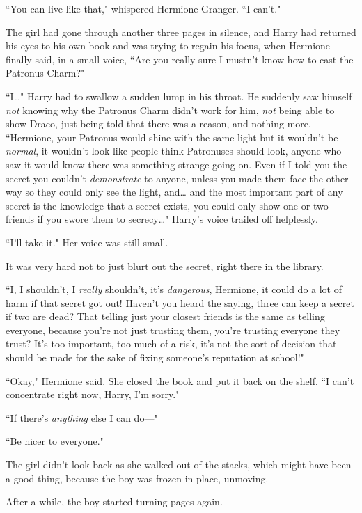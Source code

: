``You can live like that," whispered Hermione Granger. ``I can't."

The girl had gone through another three pages in silence, and Harry had returned his eyes to his own book and was trying to regain his focus, when Hermione finally said, in a small voice, ``Are you really sure I mustn't know how to cast the Patronus Charm?"

``I{\ldots}" Harry had to swallow a sudden lump in his throat. He suddenly saw himself \emph{not} knowing why the Patronus Charm didn't work for him, \emph{not} being able to show Draco, just being told that there was a reason, and nothing more. ``Hermione, your Patronus would shine with the same light but it wouldn't be \emph{normal}, it wouldn't look like people think Patronuses should look, anyone who saw it would know there was something strange going on. Even if I told you the secret you couldn't \emph{demonstrate} to anyone, unless you made them face the other way so they could only see the light, and{\ldots} and the most important part of any secret is the knowledge that a secret exists, you could only show one or two friends if you swore them to secrecy{\ldots}" Harry's voice trailed off helplessly.

``I'll take it." Her voice was still small.

It was very hard not to just blurt out the secret, right there in the library.

``I, I shouldn't, I \emph{really} shouldn't, it's \emph{dangerous}, Hermione, it could do a lot of harm if that secret got out! Haven't you heard the saying, three can keep a secret if two are dead? That telling just your closest friends is the same as telling everyone, because you're not just trusting them, you're trusting everyone they trust? It's too important, too much of a risk, it's not the sort of decision that should be made for the sake of fixing someone's reputation at school!"

``Okay," Hermione said. She closed the book and put it back on the shelf. ``I can't concentrate right now, Harry, I'm sorry."

``If there's \emph{anything} else I can do—"

``Be nicer to everyone."

The girl didn't look back as she walked out of the stacks, which might have been a good thing, because the boy was frozen in place, unmoving.

After a while, the boy started turning pages again.

